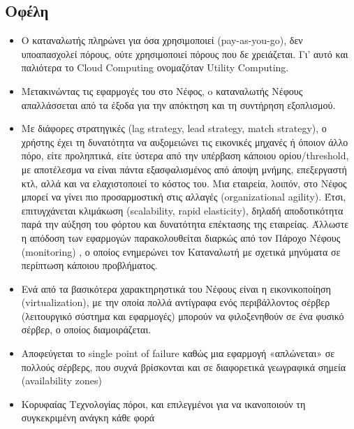 \documentclass{article}
\begin{document}
\subsection{Οφέλη}
\begin{itemize}
\item Ο καταναλωτής πληρώνει για όσα χρησιμοποιεί (pay-as-you-go), δεν υποαπασχολεί πόρους, ούτε χρησιμοποιεί πόρους που δε χρειάζεται. Γι’ αυτό και παλιότερα το Cloud Computing ονομαζόταν Utility Computing.
\item Μετακινώντας τις εφαρμογές του στο Νέφος, o καταναλωτής Νέφους  απαλλάσσεται από τα έξοδα για την απόκτηση και τη συντήρηση εξοπλισμού.
\item Με διάφορες στρατηγικές (lag strategy, lead strategy, match strategy), ο χρήστης έχει τη δυνατότητα να αυξομειώνει τις εικονικές μηχανές ή όποιον άλλο πόρο, είτε προληπτικά, είτε ύστερα από την υπέρβαση κάποιου ορίου/threshold, με αποτέλεσμα να είναι πάντα εξασφαλισμένος από άποψη μνήμης, επεξεργαστή κτλ, αλλά και να ελαχιστοποιεί το κόστος του. Μια εταιρεία, λοιπόν, στο Νέφος μπορεί να γίνει πιο προσαρμοστική στις αλλαγές (organizational agility). Έτσι, επιτυγχάνεται κλιμάκωση (scalability, rapid elasticity), δηλαδή αποδοτικότητα παρά την αύξηση του φόρτου και δυνατότητα επέκτασης της εταιρείας.
Άλλωστε η απόδοση των εφαρμογών παρακολουθείται διαρκώς από τον Πάροχο Νέφους (monitoring)
, ο οποίος ενημερώνει τον Καταναλωτή με σχετικά μηνύματα σε περίπτωση κάποιου προβλήματος.
\item Ενά από τα βασικότερα χαρακτηρηστικά του Νέφους είναι η εικονικοποίηση (virtualization), με την οποία πολλά αντίγραφα ενός περιβάλλοντος σέρβερ (λειτουργικό σύστημα και εφαρμογές) μπορούν να φιλοξενηθούν σε ένα φυσικό σέρβερ, ο οποίος διαμοιράζεται. 
\item Αποφεύγεται το single point of failure καθώς μια εφαρμογή «απλώνεται» σε πολλούς σέρβερς, που συχνά βρίσκονται και σε διαφορετικά γεωγραφικά σημεία (availability zones)
\item Κορυφαίας Τεχνολογίας πόροι, και επιλεγμένοι για να ικανοποιούν τη συγκεκριμένη ανάγκη κάθε φορά

\end{itemize}
\end{document}
